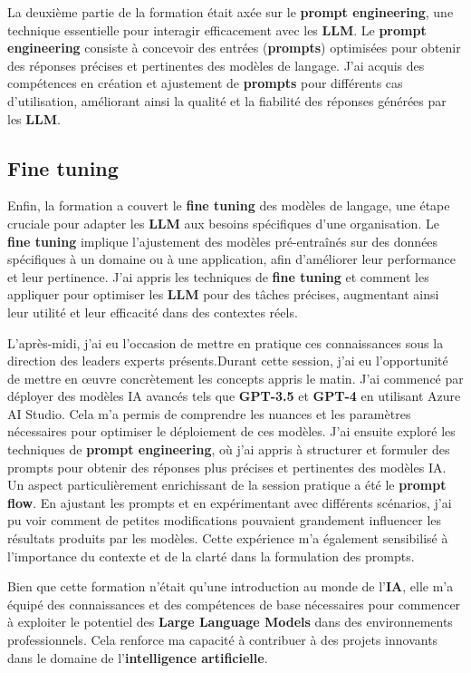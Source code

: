 La deuxième partie de la formation était axée sur le \textbf{prompt engineering}, une technique essentielle pour interagir efficacement avec les \textbf{LLM}. Le \textbf{prompt engineering} consiste à concevoir des entrées (\textbf{prompts}) optimisées pour obtenir des réponses précises et pertinentes des modèles de langage. J'ai acquis des compétences en création et ajustement de \textbf{prompts} pour différents cas d'utilisation, améliorant ainsi la qualité et la fiabilité des réponses générées par les \textbf{LLM}.

\subsection{Fine tuning}

Enfin, la formation a couvert le \textbf{fine tuning} des modèles de langage, une étape cruciale pour adapter les \textbf{LLM} aux besoins spécifiques d'une organisation. Le \textbf{fine tuning} implique l'ajustement des modèles pré-entraînés sur des données spécifiques à un domaine ou à une application, afin d'améliorer leur performance et leur pertinence. J'ai appris les techniques de \textbf{fine tuning} et comment les appliquer pour optimiser les \textbf{LLM} pour des tâches précises, augmentant ainsi leur utilité et leur efficacité dans des contextes réels.

L'après-midi, j'ai eu l'occasion de mettre en pratique ces connaissances sous la direction des leaders experts présents.Durant cette session, j'ai eu l'opportunité de mettre en œuvre concrètement les concepts appris le matin. J'ai commencé par déployer des modèles IA avancés tels que \textbf{GPT-3.5} et \textbf{GPT-4} en utilisant Azure AI Studio. Cela m'a permis de comprendre les nuances et les paramètres nécessaires pour optimiser le déploiement de ces modèles. J'ai ensuite exploré les techniques de \textbf{prompt engineering}, où j'ai appris à structurer et formuler des prompts pour obtenir des réponses plus précises et pertinentes des modèles IA. Un aspect particulièrement enrichissant de la session pratique a été le \textbf{prompt flow}. En ajustant les prompts et en expérimentant avec différents scénarios, j'ai pu voir comment de petites modifications pouvaient grandement influencer les résultats produits par les modèles. Cette expérience m'a également sensibilisé à l'importance du contexte et de la clarté dans la formulation des prompts.


Bien que cette formation n'était qu'une introduction au monde de l'\textbf{IA}, elle m'a équipé des connaissances et des compétences de base nécessaires pour commencer à exploiter le potentiel des \textbf{Large Language Models} dans des environnements professionnels. Cela renforce ma capacité à contribuer à des projets innovants dans le domaine de l'\textbf{intelligence artificielle}.

